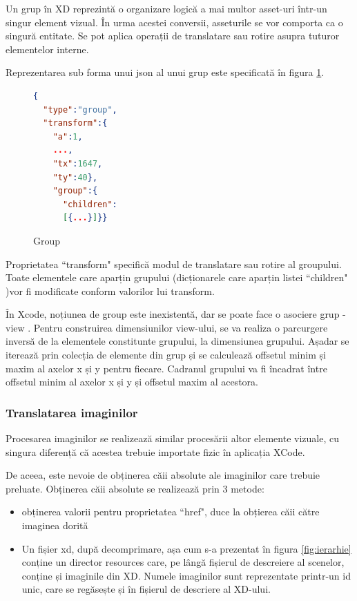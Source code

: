 Un grup în XD reprezintă o organizare logică a mai multor asset-uri într-un singur element vizual. În urma acestei conversii, asseturile se vor comporta ca o singură entitate. Se pot aplica operații de translatare sau rotire asupra tuturor elementelor interne. 

Reprezentarea sub forma unui json al unui grup este specificată în figura \ref{fig:Group}. 

\begin{figure}[!htbp]
\begin{lstlisting}[language=json,firstnumber=1]
{
  "type":"group",
  "transform":{
    "a":1,
    ...,
    "tx":1647,
    "ty":40},
    "group":{
      "children":
      [{...}]}}
\end{lstlisting}
\caption{Group} \label{fig:Group}
\end{figure}

Proprietatea ``transform" specifică modul de translatare sau rotire al groupului. Toate elementele care aparțin grupului (dicționarele care aparțin listei ``children" )vor fi modificate conform valorilor lui transform.

În Xcode, noțiunea de group este inexistentă, dar se poate face o asociere grup - view . 
Pentru construirea dimensiunilor view-ului, se va realiza o parcurgere inversă de la elementele constitunte grupului, la dimensiunea grupului. 
Așadar se iterează prin colecția de elemente din grup și se calculează offsetul minim și maxim al axelor x și y pentru fiecare. Cadranul grupului va fi încadrat între offsetul minim al axelor x și y și offsetul maxim al acestora.


\subsubsection{Translatarea imaginilor}

Procesarea imaginilor se realizează similar procesării altor elemente vizuale, cu singura diferență că acestea trebuie importate fizic în aplicația XCode.

De aceea, este nevoie de obținerea căii absolute ale imaginilor care trebuie preluate. 
Obținerea căii absolute se realizează prin 3 metode:

\begin{itemize}  
\item obținerea valorii pentru proprietatea ``href", duce la obțierea căii către imaginea dorită
\item Un fișier xd, după decomprimare, așa cum s-a prezentat în figura \ref{fig:ierarhie} conține un director resources care, pe lângă fișierul de descreiere al scenelor, conține și imaginile din XD. Numele imaginilor sunt reprezentate printr-un id unic, care se regăsește și în fișierul de descriere al XD-ului.
\end{itemize}


